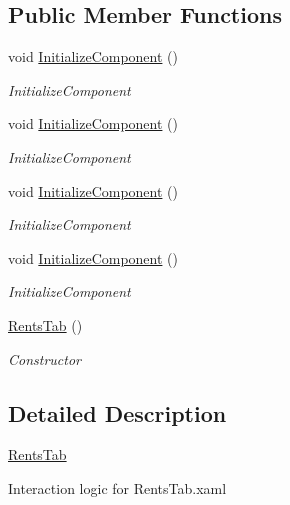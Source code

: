\subsection*{Public Member Functions}
\begin{DoxyCompactItemize}
\item 
void \hyperlink{class_baudi_1_1_client_1_1_view_1_1_tabs_1_1_rents_tab_aee4b692c51c82256f0bf7338e096263d}{Initialize\+Component} ()
\begin{DoxyCompactList}\small\item\em Initialize\+Component \end{DoxyCompactList}\item 
void \hyperlink{class_baudi_1_1_client_1_1_view_1_1_tabs_1_1_rents_tab_aee4b692c51c82256f0bf7338e096263d}{Initialize\+Component} ()
\begin{DoxyCompactList}\small\item\em Initialize\+Component \end{DoxyCompactList}\item 
void \hyperlink{class_baudi_1_1_client_1_1_view_1_1_tabs_1_1_rents_tab_aee4b692c51c82256f0bf7338e096263d}{Initialize\+Component} ()
\begin{DoxyCompactList}\small\item\em Initialize\+Component \end{DoxyCompactList}\item 
void \hyperlink{class_baudi_1_1_client_1_1_view_1_1_tabs_1_1_rents_tab_aee4b692c51c82256f0bf7338e096263d}{Initialize\+Component} ()
\begin{DoxyCompactList}\small\item\em Initialize\+Component \end{DoxyCompactList}\item 
\hyperlink{class_baudi_1_1_client_1_1_view_1_1_tabs_1_1_rents_tab_ab9601d3b7054e03a1baee1ba6ab7d3f0}{Rents\+Tab} ()
\begin{DoxyCompactList}\small\item\em Constructor \end{DoxyCompactList}\end{DoxyCompactItemize}


\subsection{Detailed Description}
\hyperlink{class_baudi_1_1_client_1_1_view_1_1_tabs_1_1_rents_tab}{Rents\+Tab} 

Interaction logic for Rents\+Tab.\+xaml 

